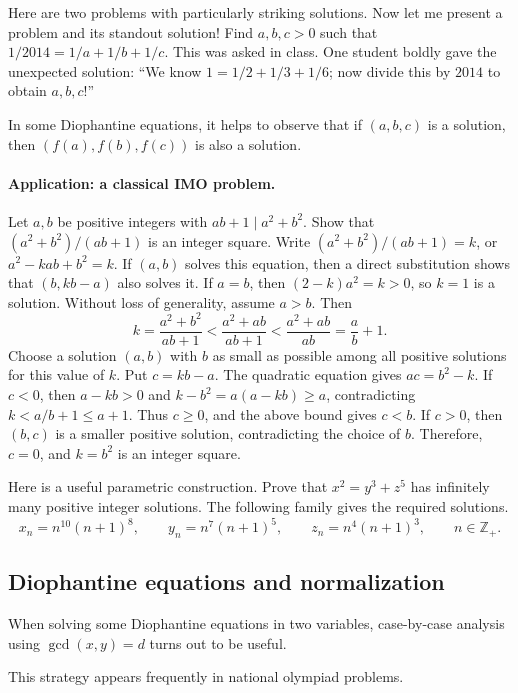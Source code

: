 \documentclass[11pt,a4paper]{article}
\begin{document}
Here are two problems with particularly striking solutions.
Now let me present a problem and its standout solution!
Find $a,b,c>0$ such that $1/2014=1/a+1/b+1/c$.
This was asked in class. One student boldly gave the unexpected solution:
``We know $1=1/2+1/3+1/6$; now divide this by $2014$ to obtain $a,b,c$!''

\setcounter{theorem}{66}\begin{lemma}
In some Diophantine equations, it helps to observe that if $(a,b,c)$ is a solution, then $(f(a),f(b),f(c))$ is also a solution.
\end{lemma}
\paragraph{Application: a classical IMO problem.}
Let $a,b$ be positive integers with $ab+1\mid a^2+b^2$.
Show that $(a^2+b^2)/(ab+1)$ is an integer square.
Write $(a^2+b^2)/(ab+1)=k$, or $a^2-kab+b^2=k$.
If $(a,b)$ solves this equation, then a direct substitution shows that $(b,kb-a)$ also solves it.
If $a=b$, then $(2-k)a^2=k>0$, so $k=1$ is a solution.
Without loss of generality, assume $a>b$. Then
\[
k=\frac{a^2+b^2}{ab+1}<\frac{a^2+ab}{ab+1}<\frac{a^2+ab}{ab}=\frac ab+1.
\]
Choose a solution $(a,b)$ with $b$ as small as possible among all positive solutions for this value of $k$.
Put $c=kb-a$. The quadratic equation gives $ac=b^2-k$.
If $c<0$, then $a-kb>0$ and $k-b^2=a(a-kb)\geq a$, contradicting $k<a/b+1\leq a+1$.
Thus $c\geq0$, and the above bound gives $c<b$.
If $c>0$, then $(b,c)$ is a smaller positive solution, contradicting the choice of $b$.
Therefore, $c=0$, and $k=b^2$ is an integer square.

Here is a useful parametric construction.
Prove that $x^2=y^3+z^5$ has infinitely many positive integer solutions.
The following family gives the required solutions.
\[
x_n=n^{10}(n+1)^8,\qquad y_n=n^7(n+1)^5,\qquad z_n=n^4(n+1)^3,
\qquad n\in\mathbb Z_+.
\]

\subsection{Diophantine equations and normalization}
\setcounter{theorem}{79}\begin{lemma}\label{lemma:lb1-82}
When solving some Diophantine equations in two variables, case-by-case analysis using $\gcd(x,y)=d$ turns out to be useful.
\end{lemma}
This strategy appears frequently in national olympiad problems.
\end{document}
